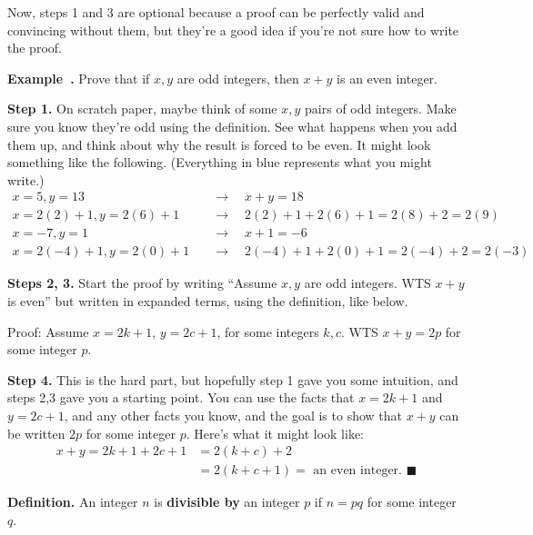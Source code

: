 \documentclass[11pt, letterpaper]{report}
\newenvironment{notes}{}{}
\newenvironment{book}{}{}
\newcounter{example}[section]
\newcommand{\example}{\refstepcounter{example}%
\par\noindent\textbf{Example~\theexample.} }
\newenvironment{definition}{\begin{bbox}\par\noindent\textbf{Definition. }}
  {\end{bbox}}
\newlength\oldfboxsep%
\newlength\myminiwidth%
\newenvironment{bbox}{%
  \setlength\oldfboxsep\fboxsep
  \setlength{\fboxsep}{.1in}%
  \setlength\myminiwidth\linewidth%
  \addtolength\myminiwidth{-0.2in}%
  \vspace{0.1in}%
  \begin{lrbox}{\bboxbox}\begin{minipage}{\myminiwidth}%
    }{%
    \end{minipage}\end{lrbox}%
  \noindent\fbox{\usebox{\bboxbox}}\vspace{0.1in}\setlength\fboxsep\oldfboxsep%
}
\begin{document}
Now, steps 1 and 3 are optional because a proof can be perfectly valid and convincing without them, but they're a good idea if you're not sure how to write the proof.

\example Prove that if $x,y$ are odd integers, then $x+y$ is an even integer.

\begin{notes}
\vfill
\newpage
\end{notes}

\begin{book}
\textbf{Step 1.} On scratch paper, maybe think of some $x,y$ pairs of odd integers. Make sure you know they're odd using the definition. See what happens when you add them up, and think about why the result is forced to be even. It might look something like the following. (Everything in blue represents what you might write.)
\color{blue}\begin{align*}
x=5,y=13 \quad &\rightarrow \quad x+y = 18\\
x=2(2)+1, y=2(6) +1 \quad &\rightarrow \quad 2(2)+1 + 2(6)+1 = 2(8)+2 = 2(9) \\
x=-7, y=1 \quad &\rightarrow \quad x+1=-6\\
x=2(-4)+1, y=2(0) +1 \quad &\rightarrow \quad 2(-4)+1 + 2(0)+1 = 2(-4)+2 = 2(-3)
\end{align*}

\color{black}

\textbf{Steps 2, 3.} Start the proof by writing ``Assume $x,y$ are odd integers. WTS $x+y$ is even'' but written in expanded terms, using the definition, like below.

\color{blue} Proof: Assume $x=2k+1$, $y=2c+1$, for some integers $k,c$. WTS $x+y = 2p$ for some integer $p.$

\color{black}

\textbf{Step 4.} This is the hard part, but hopefully step 1 gave you some intuition, and steps 2,3 gave you a starting point. You can use the facts that $x=2k+1$ and $y=2c+1$, and any other facts you know, and the goal is to show that $x+y$ can be written $2p$ for some integer $p$. Here's what it might look like:
\color{blue}
\begin{align*}
x+y = 2k+1 + 2c+1 &= 2(k+c) + 2 \\
&= 2(k+c+1) = \text{ an even integer. } \blacksquare
\end{align*}
\color{black}
\end{book}

\begin{definition}
An integer $n$ is \textbf{divisible by} an integer $p$ if $n=pq$ for some integer $q$.
\end{definition}
\end{document}
